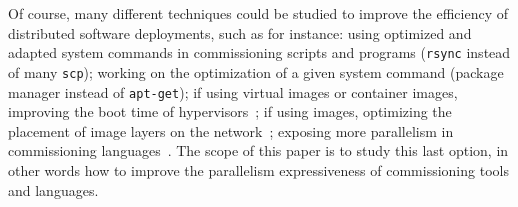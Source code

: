 Of course, many different techniques could be studied to improve the efficiency of distributed software deployments, such as for instance: using optimized and adapted system commands in commissioning scripts and programs (\eg \texttt{rsync} instead of many \texttt{scp}); working on the optimization of a given system command (\eg \nix package manager instead of \texttt{apt-get}); if using virtual images or container images, improving the boot time of hypervisors~\cite{nguyen:hal-02172288}; if using \docker images, optimizing the placement of image layers on the network~\cite{darrous:hal-01745405}; exposing more parallelism in commissioning languages~\cite{dicosmo:hal-01233489}. The scope of this paper is to study this last option, in other words how to improve the parallelism expressiveness of commissioning tools and languages.